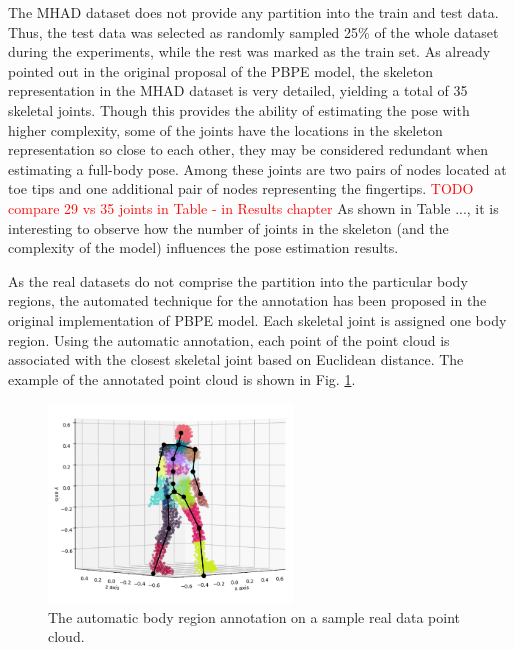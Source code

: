 \vspace{5mm}
\noindent
The MHAD dataset does not provide any partition into the train and test data. Thus, the test data was selected as randomly sampled 25\% of the whole dataset during the experiments, while the rest was marked as the train set. %
As already pointed out in the original proposal of the PBPE model, the skeleton representation in the MHAD dataset is very detailed, yielding a total of 35 skeletal joints. Though this provides the ability of estimating the pose with higher complexity, some of the joints have the locations in the skeleton representation so close to each other, they may be considered redundant when estimating a full-body pose. Among these joints are two pairs of nodes located at toe tips and one additional pair of nodes representing the fingertips.
\textcolor{red}{TODO compare 29 vs 35 joints in Table - in Results chapter} As shown in Table ..., it is interesting to observe how the number of joints in the skeleton (and the complexity of the model) influences the pose estimation results.\par
\vspace{5mm}
\noindent 
As the real datasets do not comprise the partition into the particular body regions, the automated technique for the annotation has been proposed in the original implementation of PBPE model. Each skeletal joint is assigned one body region. Using the automatic annotation, each point of the point cloud is associated with the closest skeletal joint based on Euclidean distance. The example of the annotated point cloud is shown in Fig. \ref{fig:reg_annotation}.\par 

\vspace{5mm}
\begin{figure}[H]
\begin{center}
  \includegraphics[height=200px]{images/implementation/region_annotation.png}
  \caption[The automatic body region annotation on real data.]{The automatic body region annotation on a sample real data point cloud.}
  \label{fig:reg_annotation}
\end{center}
\end{figure}

